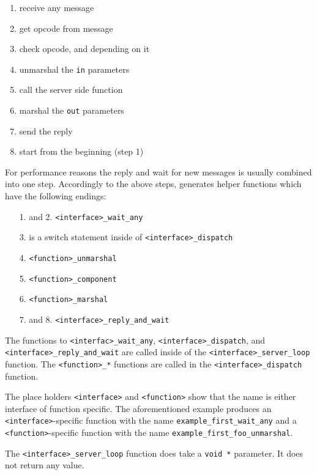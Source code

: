 \begin{enumerate}
\item receive any message
\item get opcode from message
\item check opcode, and depending on it
\item unmarshal the \verb|in| parameters
\item call the server side function
\item marshal the \verb|out| parameters
\item send the reply
\item start from the beginning (step 1)
\end{enumerate}

For performance reasons the reply and wait for new messages
is usually combined into one step. Accordingly to the above steps,
\dice{} generates helper functions which have the following
endings:

\begin{enumerate}
\item[1.] and 2. \verb|<interface>_wait_any|
\item[3.] is a switch statement inside of \verb|<interface>_dispatch|
\item[4.] \verb|<function>_unmarshal|
\item[5.] \verb|<function>_component|
\item[6.] \verb|<function>_marshal|
\item[7.] and 8. \verb|<interface>_reply_and_wait|
\end{enumerate}

The functions to \verb|<interfac>_wait_any|, \verb|<interface>_dispatch|,
and \verb|<interface>_reply_and_wait| are called inside of the 
\verb|<interface>_server_loop| function. The \verb|<function>_*| 
functions are called in the \verb|<interface>_dispatch| function.

The place holders \verb|<interface>| and \verb|<function>| show that
the name is either interface of function specific. 
The aforementioned example produces
an \verb|<interface>|-specific function with the name
\verb|example_first_wait_any| and a \verb|<function>|-specific function
with the name \verb|example_first_foo_unmarshal|.


The \verb|<interface>_server_loop| function does take a \verb|void *|
parameter. It does not return any value.

